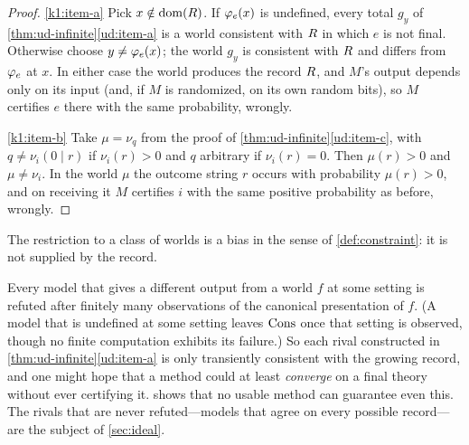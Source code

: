 \begin{proof}
\ref{k1:item-a} Pick $x\notin\operatorname{dom}(R)$. If $\varphi_{e}(x)$ is undefined, every total
$g_y$ of \cref{thm:ud-infinite}\ref{ud:item-a} is a world consistent with $R$ in
which $e$ is not final. Otherwise choose $y\ne\varphi_{e}(x)$; the world $g_y$ is
consistent with $R$ and differs from $\varphi_{e}$ at $x$. In either case the world
produces the record $R$, and $M$'s output depends only on its input (and, if $M$
is randomized, on its own random bits), so $M$ certifies $e$ there with the same
probability, wrongly.

\ref{k1:item-b} Take $\mu=\nu_q$ from the proof of
\cref{thm:ud-infinite}\ref{ud:item-c}, with $q\ne\nu_i(0\mid r)$ if $\nu_i(r)>0$ and
$q$ arbitrary if $\nu_i(r)=0$. Then $\mu(r)>0$ and $\mu\ne\nu_i$. In the world $\mu$ the
outcome string $r$ occurs with probability $\mu(r)>0$, and on receiving it $M$
certifies $i$ with the same positive probability as before, wrongly.
\end{proof}

The restriction to a class of worlds is a bias in the sense of \cref{def:constraint}: it is
not supplied by the record.

\begin{remark}\label{ud:rem-transient}
Every model that gives a different output from a world $f$ at some setting is
refuted after finitely many observations of the canonical presentation of $f$. (A
model that is undefined at some setting leaves $\operatorname{Cons}$ once that setting is
observed, though no finite computation exhibits its failure.) So each rival constructed in
\cref{thm:ud-infinite}\ref{ud:item-a} is only transiently consistent with the
growing record, and one might hope that a method could at least \emph{converge} on
a final theory without ever certifying it.  shows that no usable
method can guarantee even this. The rivals that are never refuted---models that
agree on every possible record---are the subject of \cref{sec:ideal}.
\end{remark}
